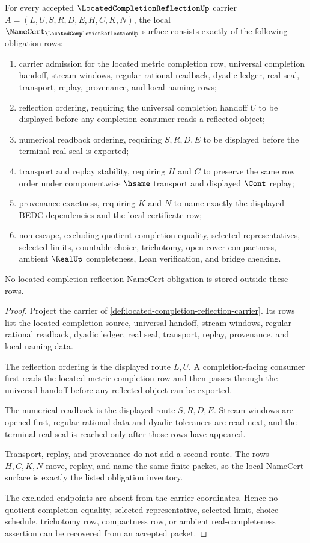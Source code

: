 \begin{theorem}
\label{thm:located-completion-reflection-namecert-obligations}
For every accepted $\LocatedCompletionReflectionUp$ carrier $A=(L,U,S,R,D,E,H,C,K,N)$, the local $\NameCert_{\LocatedCompletionReflectionUp}$ surface consists exactly of the following obligation rows:
\begin{enumerate}
\item carrier admission for the located metric completion row, universal completion handoff, stream windows, regular rational readback, dyadic ledger, real seal, transport, replay, provenance, and local naming rows;
\item reflection ordering, requiring the universal completion handoff $U$ to be displayed before any completion consumer reads a reflected object;
\item numerical readback ordering, requiring $S,R,D,E$ to be displayed before the terminal real seal is exported;
\item transport and replay stability, requiring $H$ and $C$ to preserve the same row order under componentwise $\hsame$ transport and displayed $\Cont$ replay;
\item provenance exactness, requiring $K$ and $N$ to name exactly the displayed BEDC dependencies and the local certificate row;
\item non-escape, excluding quotient completion equality, selected representatives, selected limits, countable choice, trichotomy, open-cover compactness, ambient $\RealUp$ completeness, Lean verification, and bridge checking.
\end{enumerate}
No located completion reflection NameCert obligation is stored outside these rows.
\end{theorem}
\begin{proof}
Project the carrier of \autoref{def:located-completion-reflection-carrier}. Its rows list the located completion source, universal handoff, stream windows, regular rational readback, dyadic ledger, real seal, transport, replay, provenance, and local naming data.

The reflection ordering is the displayed route $L,U$. A completion-facing consumer first reads the located metric completion row and then passes through the universal handoff before any reflected object can be exported.

The numerical readback is the displayed route $S,R,D,E$. Stream windows are opened first, regular rational data and dyadic tolerances are read next, and the terminal real seal is reached only after those rows have appeared.

Transport, replay, and provenance do not add a second route. The rows $H,C,K,N$ move, replay, and name the same finite packet, so the local NameCert surface is exactly the listed obligation inventory.

The excluded endpoints are absent from the carrier coordinates. Hence no quotient completion equality, selected representative, selected limit, choice schedule, trichotomy row, compactness row, or ambient real-completeness assertion can be recovered from an accepted packet.
\end{proof}

